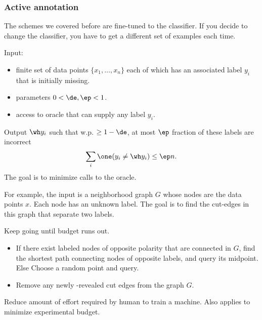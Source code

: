 \subsubsection{Active annotation}

The schemes we covered before are fine-tuned to the classifier. %
If you decide to change the classifier, you have to get a different set of examples each time.

Input:
\begin{itemize}
\item
finite set of data points $\{x_1,\ldots, x_n\}$ each of which has an associated label $y_i$ that is initially missing.
\item
parameters $0<\de,\ep<1$.
\item
access to oracle that can supply any label $y_i$.
\end{itemize}

Output $\wh y_i$ such that w.p. $\ge1-\de$,
at most $\ep$ fraction of these labels are incorrect
$$\sum_i \one(y_i\ne \wh y_i)\le \ep n.
$$
The goal is to minimize calls to the oracle.


For example, the input is a neighborhood graph $G$ whose nodes are the data points $x$. Each node has an unknown label. The goal is to find the cut-edges in this graph that separate two labels.


\begin{alg}
Keep going until budget runs out.
\begin{itemize}
\item
If there exist labeled nodes of opposite polarity that are connected in $G$, find the shortest path connecting nodes of opposite labels, and query its midpoint. Else Choose a random point and query.
\item
Remove any newly -revealed cut edges from the graph $G$.
\end{itemize}
\end{alg}


Reduce amount of effort required by human to train a machine. Also applies to minimize experimental budget.

